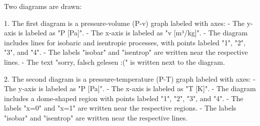 Two diagrams are drawn:  

1. The first diagram is a pressure-volume (P-v) graph labeled with axes:  
   - The y-axis is labeled as "P [Pa]".  
   - The x-axis is labeled as "v [m³/kg]".  
   - The diagram includes lines for isobaric and isentropic processes, with points labeled "1", "2", "3", and "4".  
   - The labels "isobar" and "isentrop" are written near the respective lines.  
   - The text "sorry, falsch gelesen :(" is written next to the diagram.  

2. The second diagram is a pressure-temperature (P-T) graph labeled with axes:  
   - The y-axis is labeled as "P [Pa]".  
   - The x-axis is labeled as "T [K]".  
   - The diagram includes a dome-shaped region with points labeled "1", "2", "3", and "4".  
   - The labels "x=0" and "x=1" are written near the respective regions.  
   - The labels "isobar" and "isentrop" are written near the respective lines.